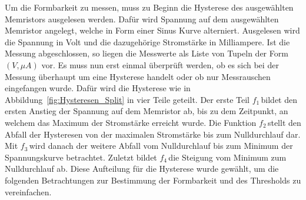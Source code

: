 Um die Formbarkeit zu messen, muss zu Beginn die Hysterese des ausgewählten Memristors ausgelesen werden. Dafür wird Spannung auf dem ausgewählten Memristor angelegt, welche in Form einer Sinus Kurve alterniert. Ausgelesen wird die Spannung in Volt und die dazugehörige Stromstärke in Milliampere. Ist die Messung abgeschlossen, so liegen die Messwerte als Liste von Tupeln der Form $(V,\mu A)$ vor. Es muss nun erst einmal überprüft werden, ob es sich bei der Messung überhaupt um eine Hysterese handelt oder ob nur Messrauschen eingefangen wurde. Dafür wird die Hysterese wie in Abbildung~\ref{fig:Hysteresen_Split} in vier Teile geteilt. Der erste Teil \glqq $f_1$\grqq\,bildet den ersten Anstieg der Spannung auf dem Memristor ab, bis zu dem Zeitpunkt, an welchem das Maximum der Stromstärke erreicht wurde. Die Funktion \glqq $f_2$\grqq\,stellt den Abfall der Hysteresen von der maximalen Stromstärke bis zum Nulldurchlauf dar. Mit \glqq $f_3$\grqq\,wird danach der weitere Abfall vom Nulldurchlauf bis zum Minimum der Spannungskurve betrachtet. Zuletzt bildet \glqq $f_4$\grqq\,die Steigung vom Minimum zum Nulldurchlauf ab. Diese Aufteilung für die Hysterese wurde gewählt, um die folgenden Betrachtungen zur Bestimmung der Formbarkeit und des Thresholds zu vereinfachen.

